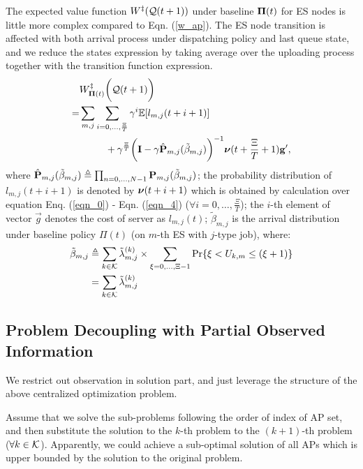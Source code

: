 The expected value function $W^{\ddagger}(\mathcal{Q}(t+1))$ under baseline $\boldsymbol{\Pi}(t)$ for ES nodes is little more complex compared to Eqn. (\ref{w_ap}).
The ES node transition is affected with both arrival process under dispatching policy and last queue state, and we reduce the states expression by taking average over the uploading process together with the transition function expression.
\begin{align}
    &W^{\ddagger}_{\boldsymbol{\Pi}(t)}\bigg(\mathcal{Q}(t+1)\bigg)
    \nonumber\\
    =& \sum_{m,j}\sum_{i=0,\dots,\frac{\Xi}{T}} \gamma^{i} \mathbb{E}[ l_{m,j}({t+i+1}) ]
    \nonumber\\
    &~~~~~~~~+ \gamma^{\frac{\Xi}{T}} \bigg( \mathbf{I} - \gamma \hat{\mathbf{P}}_{m,j}(\tilde{\beta}_{m,j}) \bigg)^{-1} \boldsymbol{\nu}({t+\frac{\Xi}{T}+1}) \mathbf{g}',
\end{align}
where $\hat{\mathbf{P}}_{m,j}(\tilde{\beta}_{m,j}) \triangleq \prod_{n=0,\dots,N-1} \mathbf{P}_{m,j}(\tilde{\beta}_{m,j})$;
the probability distribution of $l_{m,j}({t+i+1})$ is denoted by $\boldsymbol{\nu}({t+i+1})$ which is obtained by calculation over equation Enq. (\ref{eqn_0}) - Eqn. (\ref{eqn_4}) ($\forall i=0,\dots,\frac{\Xi}{T}$);
the $i$-th element of vector $\vec{g}$ denotes the cost of server as $l_{m,j}(t)$;
$\tilde{\beta}_{m,j}$ is the arrival distribution under baseline policy $\Pi(t)$ (on $m$-th ES with $j$-type job), where:
\begin{align}
    \tilde{\beta}_{m,j} &\triangleq \sum_{k\in\mathcal{K}} \tilde{\lambda}^{(k)}_{m,j} \times \sum_{\xi=0,\dots,\Xi-1} \Pr\{ \xi<U_{k,m}\leq(\xi+1) \}
        \nonumber\\
    ~~~~&= \sum_{k\in\mathcal{K}} \tilde{\lambda}^{(k)}_{m,j}
\end{align}

\subsection{Problem Decoupling with Partial Observed Information}
We restrict out observation in solution part, and just leverage the structure of the above centralized optimization problem.
\begin{remark}
    Assume that we solve the sub-problems following the order of index of AP set, and then substitute the solution to the $k$-th problem to the $(k+1)$-th problem ($\forall k\in\mathcal{K}$).
    Apparently, we could achieve a sub-optimal solution of all APs which is upper bounded by the solution to the original problem.
\end{remark}


